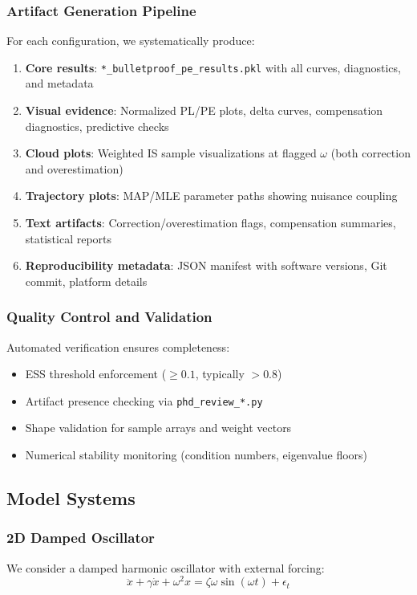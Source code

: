 \documentclass[conference]{IEEEtran}
\begin{document}
\subsubsection{Artifact Generation Pipeline}
For each configuration, we systematically produce:
\begin{enumerate}
\item \textbf{Core results}: \texttt{*\_bulletproof\_pe\_results.pkl} with all curves, diagnostics, and metadata
\item \textbf{Visual evidence}: Normalized PL/PE plots, delta curves, compensation diagnostics, predictive checks
\item \textbf{Cloud plots}: Weighted IS sample visualizations at flagged $\omega$ (both correction and overestimation)
\item \textbf{Trajectory plots}: MAP/MLE parameter paths showing nuisance coupling
\item \textbf{Text artifacts}: Correction/overestimation flags, compensation summaries, statistical reports
\item \textbf{Reproducibility metadata}: JSON manifest with software versions, Git commit, platform details
\end{enumerate}

\subsubsection{Quality Control and Validation}
Automated verification ensures completeness:
\begin{itemize}
\item ESS threshold enforcement ($\geq 0.1$, typically $> 0.8$)
\item Artifact presence checking via \texttt{phd\_review\_*.py}
\item Shape validation for sample arrays and weight vectors
\item Numerical stability monitoring (condition numbers, eigenvalue floors)
\end{itemize}

\subsection{Model Systems}

\subsubsection{2D Damped Oscillator}

We consider a damped harmonic oscillator with external forcing:
\begin{equation}
\ddot{x} + \gamma \dot{x} + \omega^2 x = \zeta \omega \sin(\omega t) + \epsilon_t
\end{equation}
\end{document}
